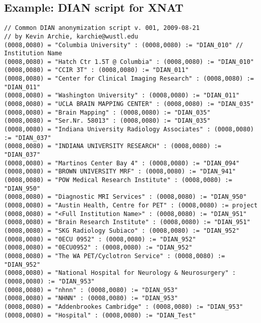 \documentclass[handout]{beamer}
\begin{document}
\subsection{Example: DIAN script for XNAT}
\begin{frame}[fragile]
\tiny
\begin{verbatim}
// Common DIAN anonymization script v. 001, 2009-08-21
// by Kevin Archie, karchie@wustl.edu
(0008,0080) = "Columbia University" : (0008,0080) := "DIAN_010" // Institution Name
(0008,0080) = "Hatch Ctr 1.5T @ Columbia" : (0008,0080) := "DIAN_010" 
(0008,0080) = "CCIR 3T" : (0008,0080) := "DIAN_011" 
(0008,0080) = "Center for Clinical Imaging Research" : (0008,0080) := "DIAN_011" 
(0008,0080) = "Washington University" : (0008,0080) := "DIAN_011" 
(0008,0080) = "UCLA BRAIN MAPPING CENTER" : (0008,0080) := "DIAN_035" 
(0008,0080) = "Brain Mapping" : (0008,0080) := "DIAN_035" 
(0008,0080) = "Ser.Nr. 58013" : (0008,0080) := "DIAN_035"
(0008,0080) = "Indiana University Radiology Associates" : (0008,0080) := "DIAN_037" 
(0008,0080) = "INDIANA UNIVERSITY RESEARCH" : (0008,0080) := "DIAN_037" 
(0008,0080) = "Martinos Center Bay 4" : (0008,0080) := "DIAN_094" 
(0008,0080) = "BROWN UNIVERSITY MRF" : (0008,0080) := "DIAN_941" 
(0008,0080) = "POW Medical Research Institute" : (0008,0080) := "DIAN_950"
(0008,0080) = "Diagnostic MRI Services" : (0008,0080) := "DIAN_950"
(0008,0080) = "Austin Health, Centre for PET" : (0008,0080) := project 
(0008,0080) = "<Full Institution Name>" : (0008,0080) := "DIAN_951"
(0008,0080) = "Brain Research Institute" : (0008,0080) := "DIAN_951"
(0008,0080) = "SKG Radiology Subiaco" : (0008,0080) := "DIAN_952"
(0008,0080) = "0ECU 0952" : (0008,0080) := "DIAN_952"
(0008,0080) = "0ECU0952" : (0008,0080) := "DIAN_952"
(0008,0080) = "The WA PET/Cyclotron Service" : (0008,0080) := "DIAN_952"
(0008,0080) = "National Hospital for Neurology & Neurosurgery" : (0008,0080) := "DIAN_953"
(0008,0080) = "nhnn" : (0008,0080) := "DIAN_953"
(0008,0080) = "NHNN" : (0008,0080) := "DIAN_953"
(0008,0080) = "Addenbrookes Cambridge" : (0008,0080) := "DIAN_953"
(0008,0080) = "Hospital" : (0008,0080) := "DIAN_Test"
\end{verbatim}
\end{frame}
\end{document}
